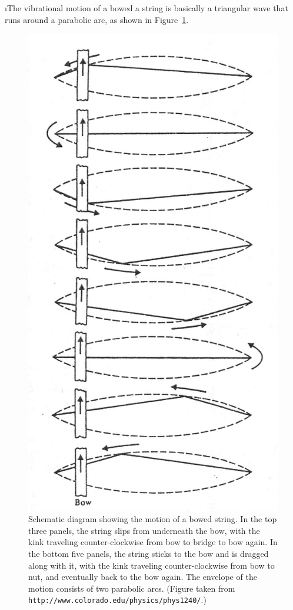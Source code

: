 \i The vibrational motion of a bowed a string 
is basically a triangular wave that runs around
a parabolic arc, as shown in Figure~\ref{f:violinbowed}.
%
\begin{figure}[htbp]
\begin{center}
\includegraphics[height=.8\textheight]{violinbowed.jpg}
\caption{Schematic diagram showing the motion of a bowed string.
In the top three panels, the string slips from underneath 
the bow, with the kink traveling counter-clockwise
from bow to bridge to bow again.
In the bottom five panels, the string sticks to the bow 
and is dragged along with it, with the kink traveling 
counter-clockwise from bow to nut, and eventually back to 
the bow again.
The envelope of the motion consists of two parabolic arcs.
(Figure taken from {\tt http://www.colorado.edu/physics/phys1240/}.)}
\label{f:violinbowed}
\end{center}
\end{figure}


